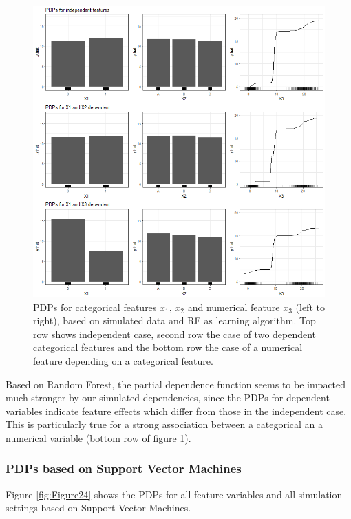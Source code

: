 \documentclass[]{krantz}
\begin{document}
\begin{figure}

\includegraphics[width=1\linewidth]{images/VK_PDP_23_Set4_RF} \hfill{}

\caption{PDPs for categorical features $x_1$, $x_2$ and numerical feature $x_3$ (left to right), based on simulated data and RF as learning algorithm. Top row shows independent case, second row the case of two dependent categorical features and the bottom row the case of a numerical feature depending on a categorical feature.}\label{fig:Figure23}
\end{figure}

Based on Random Forest, the partial dependence function seems to be
impacted much stronger by our simulated dependencies, since the PDPs for
dependent variables indicate feature effects which differ from those in
the independent case. This is particularly true for a strong association
between a categorical an a numerical variable (bottom row of figure
\ref{fig:Figure23}).

\subsubsection{PDPs based on Support Vector
Machines}\label{pdps-based-on-support-vector-machines-3}

Figure \ref{fig:Figure24} shows the PDPs for all feature variables and
all simulation settings based on Support Vector Machines.
\end{document}
